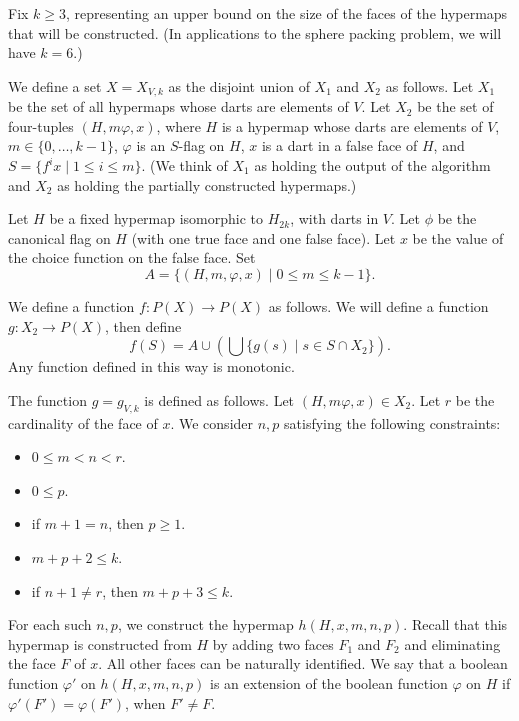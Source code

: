 Fix $k\ge 3$, representing an upper bound on the size of the faces of the hypermaps that will be constructed.  (In applications to the sphere packing problem, we will have $k=6$.)

We define a set $X = X_{V,k}$ as the disjoint union of $X_1$ and $X_2$ as follows.  Let $X_1$ be the
set of all hypermaps whose darts are elements of $V$.  Let $X_2$ be the set of four-tuples
$(H,m\varphi,x)$, where $H$ is a hypermap whose darts are elements of $V$, 
$m\in\{0,\ldots,k-1\}$, $\varphi$ is an $S$-flag on $H$, $x$ is a dart in a false face of $H$,
and $S = \{f^i x\mid 1 \le i \le m\}$.   (We think of $X_1$ as holding the output of the algorithm and $X_2$ as holding the partially constructed hypermaps.)

Let $H$ be a fixed hypermap isomorphic to $H_{2k}$,
with darts in $V$.  Let $\phi$ be the canonical flag on $H$ (with one true face and one false face).
Let $x$ be the value of the choice function on the false face.  Set
$$A = \{(H,m,\varphi,x) \mid 0\le m \le k-1 \}.$$

We define a function $f :P(X)\to P(X)$ as follows.  We will define a function 
$g:X_2 \to P(X)$, then define 
$$f(S) = A \cup  (\bigcup  \{g(s) \mid s\in S\cap X_2\}).$$
Any function defined in this way is monotonic.

The function $g = g_{V,k}$ is defined as follows.  Let $(H,m\varphi,x)\in X_2$.  Let $r$ be the
cardinality of the face of $x$.  We consider $n,p$ satisfying the following constraints:
\begin{itemize}
\item $0\le m < n < r$.
\item $0\le p$.
\item if $m+1 = n$, then $p \ge 1$.
\item $m+p+2 \le k$.
\item if $n+1\ne r$, then $m+p+3\le k$.
\end{itemize}

For each such $n,p$, we construct the hypermap $h(H,x,m,n,p)$.  Recall that this hypermap is constructed from $H$ by adding two faces $F_1$ and $F_2$ and eliminating the face $F$ of $x$.  All other faces can be naturally identified.  We say that a boolean function $\varphi'$ on $h(H,x,m,n,p)$ is an extension of the boolean function $\varphi$ on $H$ if $\varphi'(F') =\varphi(F')$, when $F'\ne F$.  

